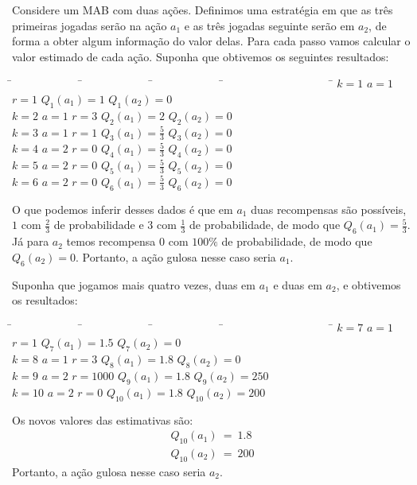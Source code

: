 \documentclass{article}
\begin{document}
            Considere um MAB com duas ações. Definimos uma estratégia em que as três primeiras jogadas serão na ação $a_1$ e as três jogadas seguinte serão em $a_2$, de forma a obter algum informação do valor delas. Para cada passo vamos calcular o valor estimado de cada ação. Suponha que obtivemos os seguintes resultados:
            \begin{tabbing}
                \hspace{4.0cm}\=~~~~~~~~~~~~ \=~~~~~~~~~~~~ \=~~~~~~~~~~~~ \=~~~~~~~~~~~~~~~~~~~ \= \kill
                \> $k = 1$   \> $a = 1$   \> $r = 1$   \> $Q_1(a_1) = 1$           \> $Q_1(a_2) = 0$\\
                \> $k = 2$   \> $a = 1$   \> $r = 3$   \> $Q_2(a_1) = 2$           \> $Q_2(a_2) = 0$\\
                \> $k = 3$   \> $a = 1$   \> $r = 1$   \> $Q_3(a_1) = \frac{5}{3}$ \> $Q_3(a_2) = 0$\\
                \> $k = 4$   \> $a = 2$   \> $r = 0$   \> $Q_4(a_1) = \frac{5}{3}$ \> $Q_4(a_2) = 0$\\
                \> $k = 5$   \> $a = 2$   \> $r = 0$   \> $Q_5(a_1) = \frac{5}{3}$ \> $Q_5(a_2) = 0$\\
                \> $k = 6$   \> $a = 2$   \> $r = 0$   \> $Q_6(a_1) = \frac{5}{3}$ \> $Q_6(a_2) = 0$
            \end{tabbing}
            O que podemos inferir desses dados é que em $a_1$ duas recompensas são possíveis, $1$ com $\frac{2}{3}$ de probabilidade e $3$ com $\frac{1}{3}$ de probabilidade, de modo que $Q_6(a_1) = \frac{5}{3}$. Já para $a_2$ temos recompensa $0$ com $100\%$ de probabilidade, de modo que $Q_6(a_2) = 0$. Portanto, a ação gulosa nesse caso seria $a_1$.
            
            Suponha que jogamos mais quatro vezes, duas em $a_1$ e duas em $a_2$, e obtivemos os resultados:
            \begin{tabbing}
                \hspace{4.0cm}\=~~~~~~~~~~~~ \=~~~~~~~~~~~~ \=~~~~~~~~~~~~ \=~~~~~~~~~~~~~~~~~~~ \= \kill
                \> $k = 7$   \> $a = 1$   \> $r = 1$   \> $Q_7(a_1) = 1.5$  \> $Q_7(a_2) = 0$\\
                \> $k = 8$   \> $a = 1$   \> $r = 3$   \> $Q_8(a_1) = 1.8$  \> $Q_8(a_2) = 0$\\
                \> $k = 9$   \> $a = 2$   \> $r = 1000$\> $Q_9(a_1) = 1.8$  \> $Q_9(a_2) = 250$\\
                \> $k = 10$  \> $a = 2$   \> $r = 0$   \> $Q_{10}(a_1) = 1.8$ \> $Q_{10}(a_2) = 200$
            \end{tabbing}
            Os novos valores das estimativas são:
            \begin{equation*}
            \begin{split}
                Q_{10}(a_1) \ = \ 1.8\\
                Q_{10}(a_2) \ = \ 200
            \end{split}
            \end{equation*}
            Portanto, a ação gulosa nesse caso seria $a_2$. 
            
\end{document}
